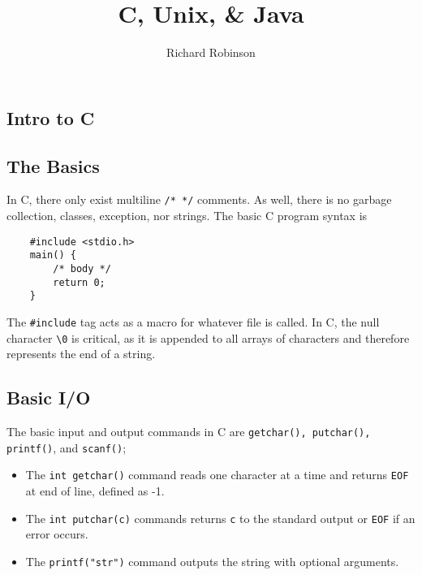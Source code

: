 \documentclass{tufte-book}
\title{C, Unix, \& Java}
\author{Richard Robinson}
\begin{document}
\maketitle
\setlength{\parindent}{0pt}
\begin{fullwidth}

\chapter{Intro to C}

\section{The Basics}

In C, there only exist multiline \lstinline{/* */} comments. As well, there is no garbage collection, classes, exception, nor strings. The basic C program syntax is
\begin{lstlisting}
    #include <stdio.h>
    main() {
        /* body */
        return 0;
    }
\end{lstlisting}
The \lstinline{#include} tag acts as a macro for whatever file is called. In C, the null character \lstinline{\0} is critical, as it is appended to all arrays of characters and therefore represents the end of a string.

\section{Basic I/O}
The basic input and output commands in C are \lstinline{getchar(), putchar(), printf()}, and \lstinline{scanf()};
\begin{itemize}
    \item The \lstinline{int getchar()} command reads one character at a time and returns \lstinline{EOF} at end of line, defined as -1.

    \item The \lstinline{int putchar(c)} commands returns \lstinline{c} to the standard output or \lstinline{EOF} if an error occurs.

    \item The \lstinline{printf("str")} command outputs the string with optional arguments.


\end{itemize}
\end{fullwidth}
\end{document}
